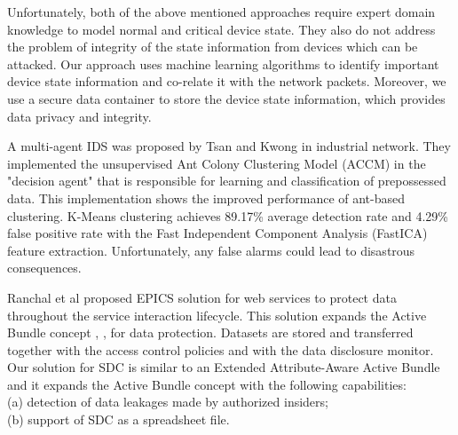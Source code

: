 \documentclass[conference]{IEEEtran}
\begin{document}
Unfortunately, both of the above mentioned approaches require expert domain knowledge to model normal and critical device state. They also do not address the problem of integrity of the state information from devices which can be attacked. Our approach uses machine learning algorithms to identify important device state information and co-relate it with the network packets. Moreover, we use a secure data container to store the device state information, which provides data privacy and integrity.
\par A multi-agent IDS was proposed by Tsan and Kwong \cite{c3} in industrial network. They implemented the unsupervised Ant Colony Clustering Model (ACCM) in the "decision agent" that is responsible for learning and classification of prepossessed data. This implementation shows the improved performance of ant-based clustering. K-Means clustering achieves 89.17\% average detection rate and  4.29\% false positive rate with the Fast Independent Component Analysis (FastICA) feature extraction. Unfortunately, any false alarms could lead to disastrous consequences.

Ranchal et al \cite{c10} proposed EPICS solution for web services to protect data throughout the service interaction lifecycle. This solution expands the Active Bundle concept \cite{c12}, \cite{c13}, \cite{c14} for data protection. Datasets are stored and transferred together with the access control policies and with the data disclosure monitor. Our solution for SDC is similar to an Extended Attribute-Aware Active Bundle \cite{c6} and it expands the Active Bundle concept with the following capabilities: \\
(a) detection of data leakages made by authorized insiders; \\
(b) support of SDC as a spreadsheet file. 
\end{document}
